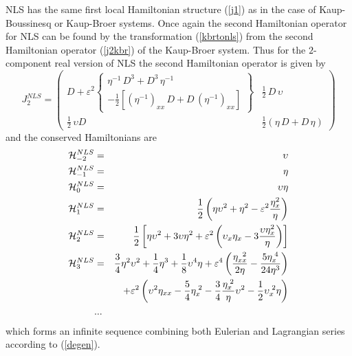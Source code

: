 \documentclass[a4paper,12pt]{article}
\begin{document}
NLS has the same first local Hamiltonian structure (\ref{j1}) as
in the case of Kaup-Boussinesq or Kaup-Broer systems. Once again
the second Hamiltonian operator for NLS can be found by the
transformation (\ref{kbrtonls}) from the second Hamiltonian
operator (\ref{j2kbr}) of the Kaup-Broer system. Thus for the
$2$-component real version of NLS the second Hamiltonian operator
is given by
\begin{equation} J^{NLS}_2 = \left( \begin{array}{cc}
 D + \varepsilon^{2}  \left\{   \begin{array}{c}
  \eta^{-1} \, D^3 + D^3 \,  \eta^{-1} \\
-\frac{1}{2} \left[  (\eta^{-1})_{xx} \, D + D \, (
\eta^{-1})_{xx}   \right]
\end{array} \right\} & \frac{1}{2} \,
 D \, \upsilon \\  \frac{1}{2} \, \upsilon D
&\frac{1}{2} (  \eta \, D  + D \, \eta )
 \end{array} \right)
 \label{j2nls}
\end{equation}
and the conserved Hamiltonians are
\begin{eqnarray}
{\cal H}_{-2}^{NLS} &=& \upsilon \\
{\cal H}_{-1}^{NLS} &=& \eta \\
{\cal H}_{0}^{NLS} &=& \upsilon \eta  \\
{\cal H}_{1}^{NLS} &=& \frac{1}{2} \left( \eta \upsilon^2 + \eta^2 -
 \varepsilon^{2} \frac{\eta_x^2}{\eta} \right)\\
{\cal H}_{2}^{NLS} &=& \frac{1}{2} \left[ \eta \upsilon^2 + 3
\upsilon  \eta^2 + \varepsilon^{2} \left( \upsilon_x  \eta_x - 3
\frac{\upsilon \eta_x^2}{\eta}
\right) \right] \\
{\cal H}_{3}^{NLS} &=&\frac{3}{4} \eta^2 \upsilon^2 + \frac{1}{4}
\eta^3 + \frac{1}{8} \upsilon^4 \eta +
 \varepsilon^{4} \left( \frac{\eta_{xx}^{\;\;2}}{2 \eta} - \frac{
 5 \eta_x^{\;4} }{ 24 \eta^3 } \right) \\
 & & +  \varepsilon^{2} \left( \upsilon^2 \eta_{xx}
 - \frac{5}{4} \eta_{x}^{\;2}
- \frac{3}{4} \frac{\eta_{x}^{\;2}}{\eta} \upsilon^2 - \frac{1}{2}
\upsilon_{x}^{\;2}  \eta \right) \nonumber
\\ &...& \nonumber
\end{eqnarray}
which forms an infinite sequence combining both Eulerian and
Lagrangian series according to (\ref{degen}).
\end{document}
